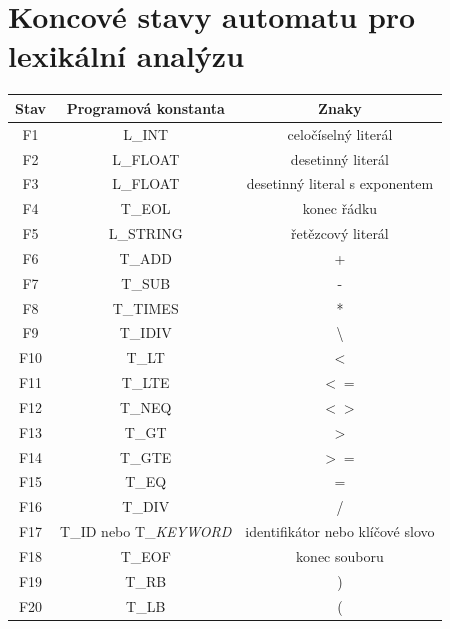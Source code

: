 \documentclass[11pt, a4paper]{article}
\begin{document}
\section{Koncové stavy automatu pro lexikální analýzu}

\begin{center}
    \begin{tabular}{ c | c | c}
        Stav & Programová konstanta & Znaky \\ \hline
        F1 & L\_INT & celočíselný literál \\ \hline
        F2 & L\_FLOAT & desetinný literál \\ \hline
        F3 & L\_FLOAT & desetinný literal s exponentem \\ \hline
        F4 & T\_EOL & konec řádku \\ \hline
        F5 & L\_STRING & řetězcový literál \\ \hline
        F6 & T\_ADD & + \\ \hline
        F7 & T\_SUB & - \\ \hline
        F8 & T\_TIMES & * \\ \hline
        F9 & T\_IDIV & \textbackslash \\ \hline
        F10 & T\_LT & $<$ \\ \hline
        F11 & T\_LTE & $<=$ \\ \hline
        F12 & T\_NEQ & $<>$ \\ \hline
        F13 & T\_GT & $>$ \\ \hline
        F14 & T\_GTE & $>=$ \\ \hline
        F15 & T\_EQ & $=$ \\ \hline
        F16 & T\_DIV & / \\ \hline
        F17 & T\_ID nebo T\_\textit{KEYWORD} & identifikátor nebo klíčové slovo \\ \hline
        F18 & T\_EOF & konec souboru \\ \hline
        F19 & T\_RB & ) \\ \hline
        F20 & T\_LB & ( \\
    \end{tabular}
\end{center}

\newpage
\end{document}
